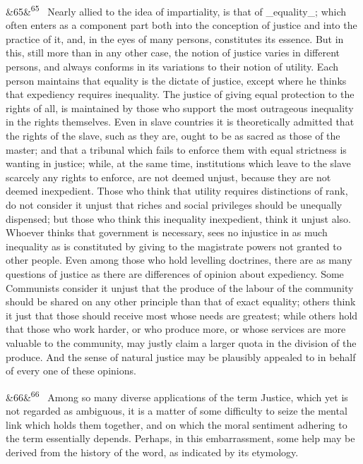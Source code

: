 \documentclass[12pt]{article}
\newcommand{\para}[1][]{\par\noindent\ifx&#1&\else\textsuperscript{\footnotesize #1}~\fi}
\begin{document}
\para[65] Nearly allied to the idea of impartiality, is that of \_equality\_; which often enters as a component part both into the conception of justice and into the practice of it, and, in the eyes of many persons, constitutes its essence. But in this, still more than in any other case, the notion of justice varies in different persons, and always conforms in its variations to their notion of utility. Each person maintains that equality is the dictate of justice, except where he thinks that expediency requires inequality. The justice of giving equal protection to the rights of all, is maintained by those who support the most outrageous inequality in the rights themselves. Even in slave countries it is theoretically admitted that the rights of the slave, such as they are, ought to be as sacred as those of the master; and that a tribunal which fails to enforce them with equal strictness is wanting in justice; while, at the same time, institutions which leave to the slave scarcely any rights to enforce, are not deemed unjust, because they are not deemed inexpedient. Those who think that utility requires distinctions of rank, do not consider it unjust that riches and social privileges should be unequally dispensed; but those who think this inequality inexpedient, think it unjust also. Whoever thinks that government is necessary, sees no injustice in as much inequality as is constituted by giving to the magistrate powers not granted to other people. Even among those who hold levelling doctrines, there are as many questions of justice as there are differences of opinion about expediency. Some Communists consider it unjust that the produce of the labour of the community should be shared on any other principle than that of exact equality; others think it just that those should receive most whose needs are greatest; while others hold that those who work harder, or who produce more, or whose services are more valuable to the community, may justly claim a larger quota in the division of the produce. And the sense of natural justice may be plausibly appealed to in behalf of every one of these opinions.

\para[66] Among so many diverse applications of the term Justice, which yet is not regarded as ambiguous, it is a matter of some difficulty to seize the mental link which holds them together, and on which the moral sentiment adhering to the term essentially depends. Perhaps, in this embarrassment, some help may be derived from the history of the word, as indicated by its etymology.
\end{document}
